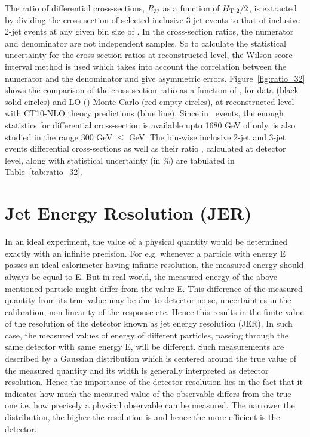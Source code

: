 The ratio of differential cross-sections, $R_{32}$ as a function of $H_{\mathrm{T,2}}/2$, is extracted by dividing the cross-section of selected inclusive 3-jet events to that of inclusive 2-jet events at any given bin size of \httwo. In the cross-section ratios, the numerator and denominator are not independent samples. So to calculate the statistical uncertainty for the cross-section ratios at reconstructed level, the Wilson score interval method is used which takes into account the correlation between the numerator and the denominator and give asymmetric errors. Figure~\ref{fig:ratio_32} shows the comparison of the cross-section ratio \ratio as a function of \httwons, for data (black solid circles) and LO \MadGraphFn\plusn \PYTHIAS (\MGP) Monte Carlo (red empty circles), at reconstructed level with CT10-NLO theory predictions (blue line). Since in \njth~events, the enough statistics for differential cross-section is available upto 1680 GeV of \httwo only, \ratio is also studied in the range 300 GeV $\leq$ \httwo {} GeV. The bin-wise inclusive 2-jet and 3-jet events differential cross-sections as well as their ratio \ratio, calculated at detector level, along with statistical uncertainty (in \%) are tabulated in Table~\ref{tab:ratio_32}. 

\section{Jet Energy Resolution (JER)}
\label{sec:Resolution}
In an ideal experiment, the value of a physical quantity would be determined exactly with an infinite precision. For e.g. whenever a particle with energy E passes an ideal calorimeter having infinite resolution, the measured energy should always be equal to E. But in real world, the measured energy of the above mentioned particle might differ from the value E. This difference of the measured quantity from its true value may be due to detector noise, uncertainties in the calibration, non-linearity of the response etc. Hence this results in the finite value of the resolution of the detector known as jet energy resolution (JER). In such case, the measured values of energy of different particles, passing through the same detector with same energy E, will be different. Such measurements are described by a Gaussian distribution which is centered around the true value of the measured quantity and its width is generally interpreted as detector resolution. Hence the importance of the detector resolution lies in the fact that it indicates how much the measured value of the observable differs from the true one i.e. how precisely a physical observable can be measured. The narrower the distribution, the higher the resolution is and hence the more efficient is the detector. %

